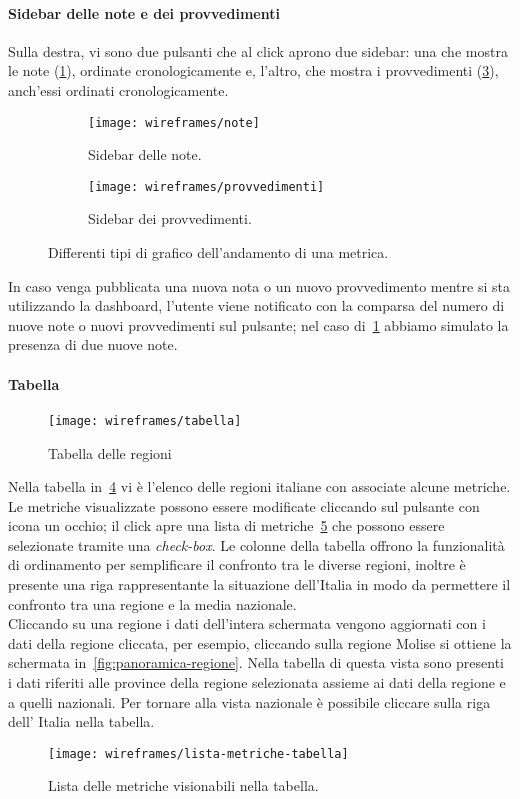 \paragraph{Sidebar delle note e dei provvedimenti}
Sulla destra, vi sono due pulsanti che al click aprono due sidebar: una che mostra le note (\ref{fig:note}), ordinate cronologicamente e, l'altro, che mostra i provvedimenti (\ref{fig:provvedimenti}), anch'essi ordinati cronologicamente. 
\begin{figure}[H]
    \begin{subfigure}[b]{0.5\textwidth}
        \centering
        \texttt{[image: wireframes/note]}
        \caption{Sidebar delle note.}\label{fig:note}
    \end{subfigure}
\hfill
    \begin{subfigure}[b]{0.5\textwidth}
        \centering
        \texttt{[image: wireframes/provvedimenti]}
        \caption{Sidebar dei provvedimenti.}\label{fig:provvedimenti}
    \end{subfigure}
    \caption{Differenti tipi di grafico dell'andamento di una metrica.}
\end{figure}
In caso venga pubblicata una nuova nota o un nuovo provvedimento mentre si sta utilizzando la dashboard, l'utente viene notificato con la comparsa del numero di nuove note o nuovi provvedimenti sul pulsante; nel caso di~\ref{fig:note} abbiamo simulato la presenza di due nuove note.

\paragraph{Tabella}
\begin{figure}[H]
    \centering
    \texttt{[image: wireframes/tabella]}
    \caption{Tabella delle regioni}\label{fig:tabella}
\end{figure}
Nella tabella in~\ref{fig:tabella} vi è l'elenco delle regioni italiane con associate alcune metriche. Le metriche visualizzate possono essere modificate cliccando sul pulsante con icona un occhio; il click apre una lista di metriche~\ref{fig:lista-metriche-tabella} che possono essere selezionate tramite una \textit{check-box}. Le colonne della tabella offrono la funzionalità di ordinamento per semplificare il confronto tra le diverse regioni, inoltre è presente una riga rappresentante la situazione dell'Italia in modo da permettere il confronto tra una regione e la media nazionale.\\
Cliccando su una regione i dati dell'intera schermata vengono aggiornati con i dati della regione cliccata, per esempio, cliccando sulla regione Molise si ottiene la schermata in~\ref{fig:panoramica-regione}. Nella tabella di questa vista sono presenti i dati riferiti alle province della regione selezionata assieme ai dati della regione e a quelli nazionali. Per tornare alla vista nazionale è possibile cliccare sulla riga dell' Italia nella tabella.
\begin{figure}[H]
    \centering
    \texttt{[image: wireframes/lista-metriche-tabella]}
    \caption{Lista delle metriche visionabili nella tabella.}\label{fig:lista-metriche-tabella}
\end{figure}

